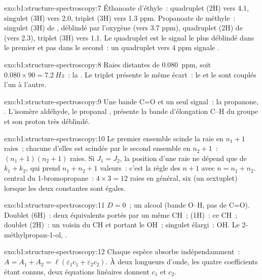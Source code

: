 \begin{solution}{exo:b1:structure-spectroscopy:7}
Éthanoate d'éthyle~: quadruplet (2H) vers 4.1, singulet (3H) vers 2.0,
triplet (3H) vers 1.3 ppm. Propanoate de méthyle~: singulet (3H) de
, déblindé par l'oxygène (vers 3.7 ppm), quadruplet (2H) de
 (vers 2.3), triplet (3H) vers 1.1. Le quadruplet est le
signal le plus déblindé dans le premier et pas dans le second~: un
quadruplet vers 4 ppm signale .
\end{solution}

\begin{solution}{exo:b1:structure-spectroscopy:8}
Raies distantes de \qty{0.080}{ppm}, soit $0.080 \times 90 = \qty{7.2}{Hz}$~:
la . Le triplet présente le même écart~: le
 et le  sont couplés l'un à l'autre.
\end{solution}

\begin{solution}{exo:b1:structure-spectroscopy:9}
Une bande C=O et un seul signal~: la propanone, . L'isomère
aldéhyde, le propanal , présente la bande d'élongation C--H
du groupe  et son proton très déblindé.
\end{solution}

\begin{solution}{exo:b1:structure-spectroscopy:10}
Le premier ensemble scinde la raie en $n_1 + 1$ raies~; chacune d'elles
est scindée par le second ensemble en $n_2 + 1$~: $(n_1 + 1)(n_2 + 1)$
raies. Si $J_1 =
J_2$, la position d'une raie ne dépend que de $k_1 + k_2$, qui prend $n_1 + n_2 +
1$ valeurs~: c'est la règle des $n + 1$ avec $n = n_1 + n_2$. 
central du 1-bromopropane~: $4 \times 3 = 12$ raies en général, six (un
sextuplet) lorsque les deux constantes sont égales.
\end{solution}

\begin{solution}{exo:b1:structure-spectroscopy:11}
$D = 0$~; un alcool (bande O--H, pas de C=O). Doublet (6H)~: deux
 équivalents portés par un même CH~;  (1H)~: ce CH~;
doublet (2H)~: un  voisin du CH et portant le OH~; singulet
élargi~: OH. Le 2-méthylpropan-1-ol, .
\end{solution}

\begin{solution}{exo:b1:structure-spectroscopy:12}
Chaque espèce absorbe indépendamment~: $A = A_1 + A_2 = \ell(\varepsilon_1c_1
+ \varepsilon_2c_2)$. À deux longueurs d'onde, les quatre coefficients
étant connus, deux équations linéaires donnent $c_1$ et $c_2$.
\end{solution}

